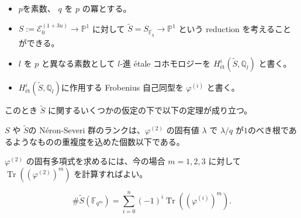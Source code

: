 \documentclass{classes/mybeamer}
\DeclareMathOperator{\Tr}{Tr}
\newcommand{\Neron}{N\'eron}
\begin{document}
\begin{frame}
    \begin{itemize}
        \item $p$を素数、 $q$ を $p$ の冪とする。
        \item $S:=\mathcal{E}_{0}^{(1 + 3u)}\to \mathbb{P}^{1}$ に対して $\tilde{S} = S_{\overline{\mathbb{F}_q}} \to \mathbb{P}^1$ という reduction を考えることができる。
        \item $l$ を $p$ と異なる素数として $l$-進 \'etale コホモロジーを $H^{i}_{\text{\'et}}(\tilde{S}, \mathbb{Q}_l)$ と書く。
        \item $H^{i}_{\text{\'et}}(\tilde{S}, \mathbb{Q}_l)$に作用する Frobenius 自己同型を $\varphi^{(i)}$ と書く。
    \end{itemize}
    このとき $\tilde{S}$ に関するいくつかの仮定の下で以下の定理が成り立つ。
    \begin{thm}
        \label{cor:ns_upper_bound}
        $S$ や $\tilde{S}$の \Neron-Severi 群のランクは、$\varphi^{(2)}$ の固有値 $\lambda$ で $\lambda/q$ が$1$のべき根であるようなものの重複度を込めた個数以下である。
    \end{thm}
    $\varphi^{(2)}$ の固有多項式を求めるには、今の場合 $m=1,2,3$ に対して $\Tr((\varphi^{(2)})^m)$ を計算すればよい。
    \begin{thm}
        \begin{equation*}
            \# \tilde{S}(\mathbb{F}_{q^{m}}) = \sum_{i = 0}^{n} ( - 1)^{i} \Tr((\varphi^{(i)})^{m}).
        \end{equation*}
    \end{thm}
\end{frame}
\end{document}
